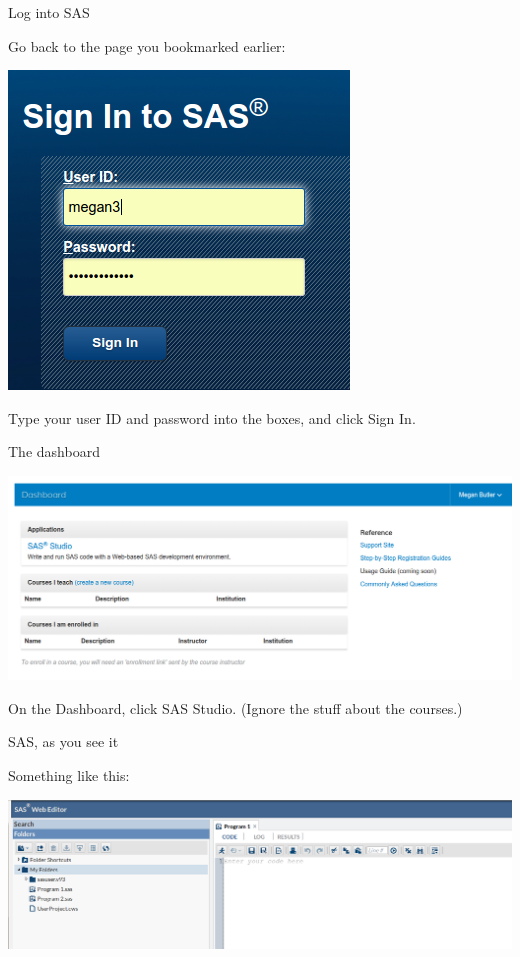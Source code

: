 \documentclass[unknownkeysallowed]{beamer}\usepackage[]{graphicx}\usepackage[]{color}
\begin{document}
\begin{frame}[fragile]{Log into SAS}

Go back to the page you bookmarked earlier:

\includegraphics[height=0.7\textheight]{sas1b}

Type your user ID and password into the boxes, and click Sign In.
  
\end{frame}


\begin{frame}[fragile]{The dashboard}

\includegraphics[width=\textwidth]{sas6}

On the Dashboard, click SAS Studio. (Ignore the stuff about the
courses.) 
  
\end{frame}

\begin{frame}[fragile]{SAS, as you see it}

Something like this:

\includegraphics[scale=0.3]{sas-webed-opening}
  
\end{frame}
\end{document}
